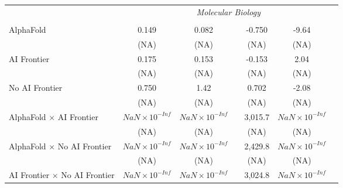 \begin{tabular}{lcccccc}
 & \multicolumn{6}{c}{\textit{Molecular Biology}} \\ \\
   AlphaFold                                                                  & 0.149                  & 0.082                  &                        & -0.750  & -9.64                  &   \\   
                                                                              & (NA)                   & (NA)                   &                        & (NA)    & (NA)                   &   \\   
   AI Frontier                                                                & 0.175                  & 0.153                  &                        & -0.153  & 2.04                   &   \\   
                                                                              & (NA)                   & (NA)                   &                        & (NA)    & (NA)                   &   \\   
   No AI Frontier                                                             & 0.750                  & 1.42                   &                        & 0.702   & -2.08                  &   \\   
                                                                              & (NA)                   & (NA)                   &                        & (NA)    & (NA)                   &   \\   
   AlphaFold $\times$ AI Frontier                                             & $NaN\times 10^{-Inf}$  & $NaN\times 10^{-Inf}$  &                        & 3,015.7 & $NaN\times 10^{-Inf}$  &   \\   
                                                                              & (NA)                   & (NA)                   &                        & (NA)    & (NA)                   &   \\   
   AlphaFold $\times$ No AI Frontier                                          & $NaN\times 10^{-Inf}$  & $NaN\times 10^{-Inf}$  &                        & 2,429.8 & $NaN\times 10^{-Inf}$  &   \\   
                                                                              & (NA)                   & (NA)                   &                        & (NA)    & (NA)                   &   \\   
   AI Frontier $\times$ No AI Frontier                                        & $NaN\times 10^{-Inf}$  & $NaN\times 10^{-Inf}$  &                        & 3,024.8 & $NaN\times 10^{-Inf}$  &   \\   

\end{tabular}
